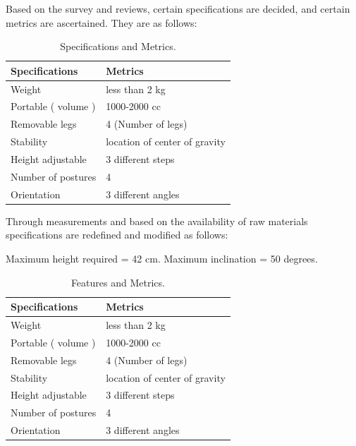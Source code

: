 Based on the survey and reviews, certain specifications are decided, and certain metrics are ascertained. They are as follows:

\begin{table}[h!]
  \centering
  \caption{Specifications and Metrics.}
  \label{tab:table1}
  \begin{tabular}{l||l}
  	\hline
  	Specifications & Metrics\\
    \hline
	Weight & less than 2 kg\\
	Portable ( volume ) &1000-2000 cc\\
	Removable legs & 4 (Number of legs)\\
	Stability & location of center of gravity\\
	Height adjustable & 3 different steps\\
	Number of postures & 4\\
	Orientation & 3 different angles\\

  \end{tabular}
\end{table}

Through measurements and based on the availability of raw materials specifications are redefined and modified as follows:

Maximum height required = 42 cm.
\newline
Maximum inclination = 50 degrees.

\begin{table}[h!]
  \centering
  \caption{Features and Metrics.}
  \label{tab:table2}
  \begin{tabular}{l||l}
  	\hline
  	Specifications & Metrics\\
    \hline
	Weight & less than 2 kg\\
	Portable ( volume ) &1000-2000 cc\\
	Removable legs & 4 (Number of legs)\\
	Stability & location of center of gravity\\
	Height adjustable & 3 different steps\\
	Number of postures & 4\\
	Orientation & 3 different angles\\

  \end{tabular}
\end{table}


